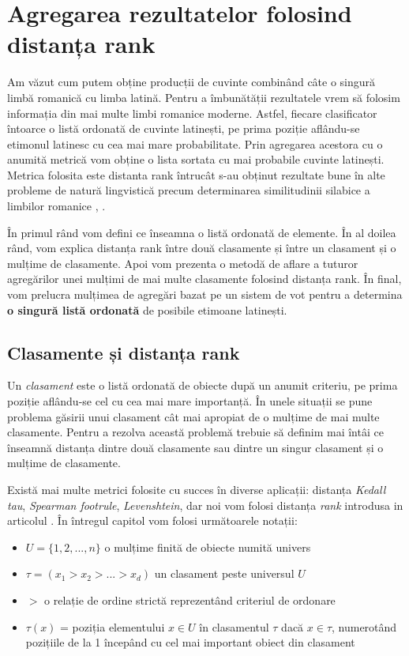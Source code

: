 \chapter{Agregarea rezultatelor folosind distanța rank}
\label{chap:three}
Am văzut cum putem obține producții de cuvinte combinând câte o singură limbă romanică cu 
limba latină. Pentru a îmbunătății rezultatele vrem să folosim informația din mai multe 
limbi romanice moderne. Astfel, fiecare clasificator întoarce o listă ordonată de cuvinte latinești, 
pe prima poziție aflându-se etimonul latinesc cu cea mai mare probabilitate. Prin agregarea 
acestora cu o anumită metrică vom obține o lista sortata cu mai probabile cuvinte latinești. Metrica
folosita este distanta rank \cite{rankdistance} întrucât s-au obținut rezultate bune în alte 
probleme de natură lingvistică precum determinarea similitudinii silabice a limbilor romanice 
\cite{syllabicsim}, \cite{simnat}.

În primul rând vom defini ce înseamna o listă ordonată de elemente. În al doilea rând, vom explica
distanța rank între două clasamente și între un clasament și o mulțime de clasamente. Apoi vom
prezenta o metodă de aflare a tuturor agregărilor unei mulțimi de mai multe clasamente folosind
distanța rank. În final, vom prelucra mulțimea de agregări bazat pe un sistem de vot pentru a 
determina \textbf{o singură listă ordonată} de posibile etimoane latinești.

\section{Clasamente și distanța rank}
Un \textit{clasament} este o listă ordonată de obiecte după un anumit criteriu, pe prima poziție 
aflându-se cel cu cea mai mare importanță. În unele situații se pune problema găsirii unui clasament
cât mai apropiat de o mulțime de mai multe clasamente. Pentru a rezolva această problemă trebuie să
definim mai întâi ce înseamnă distanța dintre două clasamente sau dintre un singur clasament și o
mulțime de clasamente.

Există mai multe metrici folosite cu succes în diverse aplicații: distanța \textit{Kedall tau}, 
\textit{Spearman footrule}, \textit{Levenshtein}, dar noi vom folosi distanța \textit{rank}
introdusa in articolul \cite{rankdistance}. În întregul capitol vom folosi următoarele notații:
\begin{itemize}
    \item $U = \{1, 2, ..., n\}$ o mulțime finită de obiecte numită univers 
    \item $\tau = (x_1 > x_2 > ... > x_d)$ un clasament peste universul $U$ 
    \item $>$ o relație de ordine strictă reprezentând criteriul de ordonare 
    \item $\tau(x)$ = poziția elementului $x \in U$ în clasamentul $\tau$ dacă $x \in \tau$, 
      numerotând pozițiile de la 1 începând cu cel mai important obiect din clasament
\end{itemize}

